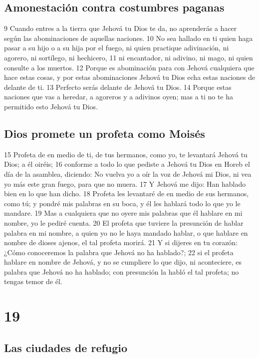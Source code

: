 \section{Amonestación contra costumbres paganas}

9 Cuando entres a la tierra que Jehová tu Dios te da, no aprenderás a hacer según las abominaciones de aquellas naciones.
10 No sea hallado en ti quien haga pasar a su hijo o a su hija por el fuego, ni quien practique adivinación, ni agorero, ni sortílego, ni hechicero,
11 ni encantador, ni adivino, ni mago, ni quien consulte a los muertos.
12 Porque es abominación para con Jehová cualquiera que hace estas cosas, y por estas abominaciones Jehová tu Dios echa estas naciones de delante de ti.
13 Perfecto serás delante de Jehová tu Dios. 
14 Porque estas naciones que vas a heredar, a agoreros y a adivinos oyen; mas a ti no te ha permitido esto Jehová tu Dios.

\section{Dios promete un profeta como Moisés}

15 Profeta de en medio de ti, de tus hermanos, como yo, te levantará Jehová tu Dios; a él oiréis;
16 conforme a todo lo que pediste a Jehová tu Dios en Horeb el día de la asamblea, diciendo: No vuelva yo a oír la voz de Jehová mi Dios, ni vea yo más este gran fuego, para que no muera.
17 Y Jehová me dijo: Han hablado bien en lo que han dicho.
18 Profeta les levantaré de en medio de sus hermanos, como tú; y pondré mis palabras en su boca, y él les hablará todo lo que yo le mandare.
19 Mas a cualquiera que no oyere mis palabras que él hablare en mi nombre, yo le pediré cuenta. 
20 El profeta que tuviere la presunción de hablar palabra en mi nombre, a quien yo no le haya mandado hablar, o que hablare en nombre de dioses ajenos, el tal profeta morirá.
21 Y si dijeres en tu corazón: ¿Cómo conoceremos la palabra que Jehová no ha hablado?;
22 si el profeta hablare en nombre de Jehová, y no se cumpliere lo que dijo, ni aconteciere, es palabra que Jehová no ha hablado; con presunción la habló el tal profeta; no tengas temor de él.

\chapter{19}


\section{Las ciudades de refugio}


